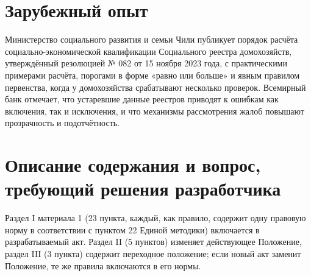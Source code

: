 \documentclass[14pt,a4paper]{extarticle}
\begin{document}
\section{Зарубежный опыт}
Министерство социального развития и семьи Чили публикует порядок расчёта социально-экономической квалификации Социального реестра домохозяйств, утверждённый резолюцией № 082 от 15 ноября 2023 года, с практическими примерами расчёта, порогами в форме «равно или больше» и явным правилом первенства, когда у домохозяйства срабатывают несколько проверок\cite{chile}. Всемирный банк отмечает, что устаревшие данные реестров приводят к ошибкам как включения, так и исключения, и что механизмы рассмотрения жалоб повышают прозрачность и подотчётность\cite{wb2025}.

\section{Описание содержания и вопрос, требующий решения разработчика}\label{sec:q}
Раздел I материала 1 (23 пункта, каждый, как правило, содержит одну правовую норму в соответствии с пунктом 22 Единой методики) включается в разрабатываемый акт. Раздел II (5 пунктов) изменяет действующее Положение, раздел III (3 пункта) содержит переходное положение; если новый акт заменит Положение, те же правила включаются в его нормы.
\end{document}
